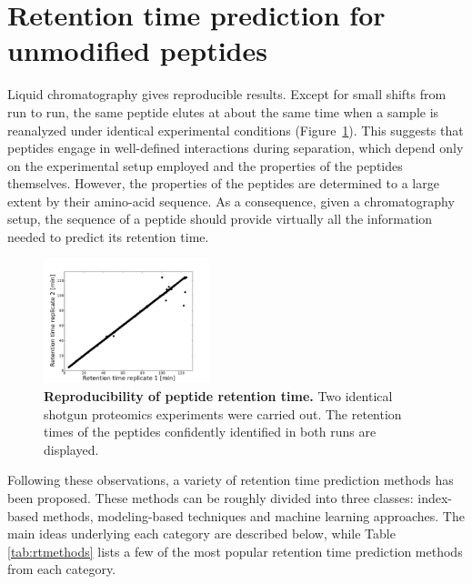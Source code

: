 \documentclass[a4paper]{article}
\begin{document}
\section{\label{sec:rtpred}Retention time prediction for unmodified peptides}


Liquid chromatography gives reproducible results. Except for small
shifts from run to run, the same peptide elutes at about the same time
when a sample is reanalyzed under identical experimental conditions
(Figure~\ref{fig:repr}). This suggests that peptides engage in
well-defined interactions during separation, which depend only on the
experimental setup employed and the properties of the peptides
themselves. However, the properties of the peptides are determined to
a large extent by their amino-acid sequence. As a consequence, given a
chromatography setup, the sequence of a peptide should provide
virtually all the information needed to predict its retention time.

\begin{figure}
\vspace{-10pt}
\centering
\includegraphics[trim=0.5cm 0cm 2cm 1.5cm, clip=true, width=0.43\textwidth]{img/reproducibility.pdf}
\caption{\label{fig:repr} {\bf Reproducibility of peptide retention time.} Two identical shotgun proteomics experiments were carried out. The retention times of the peptides confidently identified in both runs are displayed.}
\vspace{-25pt}
\end{figure}

\vspace{0.15cm}

Following these observations, a variety of retention time prediction
methods has been proposed. These methods can be roughly divided into
three classes: index-based methods, modeling-based techniques and
machine learning approaches. The main ideas underlying each category
are described below, while Table \ref{tab:rtmethods} lists a few of the most popular retention time 
prediction methods from each category.
\end{document}
